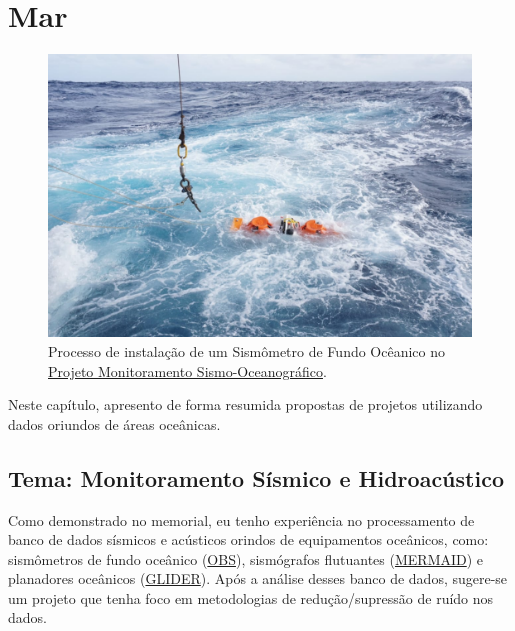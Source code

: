 \documentclass[10pt,a4paper,oneside]{book}
\newcommand{\HeroFigPad}{\vspace{-1cm}}
\begin{document}

\chapter{Mar}
\label{cap_mar}

\begin{figure}[h]
	\HeroFigPad
	\begin{center}
		\includegraphics[width=\textwidth]{images/obs_foto.jpeg}
	\end{center}
	\caption{
	Processo de instalação de um Sismômetro de Fundo Ocêanico no \href{https://sismo-oceano.ufsc.br/}{Projeto Monitoramento Sismo-Oceanográfico}.
    }
 \label{fig_obs}
\end{figure}

Neste capítulo, apresento de forma resumida propostas de projetos utilizando dados oriundos de áreas oceânicas.   

\section{Tema: Monitoramento Sísmico e Hidroacústico}

Como demonstrado no memorial, eu tenho experiência no processamento de banco de dados sísmicos e acústicos orindos de equipamentos oceânicos, como: sismômetros de fundo oceânico (\href{https://en.wikipedia.org/wiki/Ocean-bottom_seismometer}{OBS}), sismógrafos flutuantes (\href{https://www.geoazur.fr/GLOBALSEIS/Mermaid.html}{MERMAID}) e planadores oceânicos (\href{https://oceanservice.noaa.gov/facts/ocean-gliders.html}{GLIDER}). Após a análise desses banco de dados, sugere-se um projeto que tenha foco em metodologias de redução/supressão de ruído nos dados.
\end{document}
